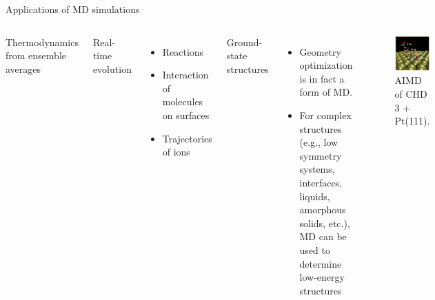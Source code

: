 \documentclass[aspectratio=169]{beamer}
\begin{document}
    \begin{frame}{Applications of MD simulations}
        \begin{columns}
            Thermodynamics from ensemble averages

            Real-time evolution
            \begin{itemize}
                \item Reactions
                \item Interaction of molecules on surfaces
                \item Trajectories of ions
            \end{itemize}

            Ground-state structures
            \begin{itemize}
                \item Geometry optimization is in fact a form of MD.
                \item For complex structures (e.g., low symmetry systems, interfaces, liquids, amorphous solids, etc.), MD can be used to determine low-energy structures
            \end{itemize}
            \begin{figure}
                \centering
                \includegraphics[width=\linewidth]{lectures/figures/13_CHD_Pt.png}
                \caption{AIMD of CHD 3 + Pt(111).\cite{nattinoInitioMolecularDynamics2014}}

            \end{figure}
        \end{columns}

    \end{frame}
\end{document}
